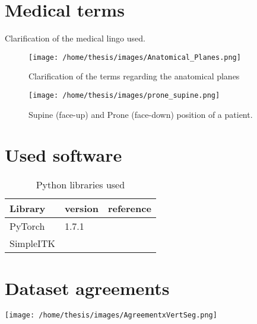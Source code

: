 \documentclass[
    a4paper, %
    9pt, %
    oneside, 
    onecolumn, %
    openany, %
    ]{memoir}
\begin{document}
\chapter{Medical terms}

Clarification of the medical lingo used.

\begin{SCfigure}[][htb]
  \centering
  \texttt{[image: /home/thesis/images/Anatomical\_Planes.png]}
  \caption{Clarification of the terms regarding the anatomical planes
  }
\end{SCfigure}

\begin{SCfigure}[][htb]
  \centering
  \texttt{[image: /home/thesis/images/prone\_supine.png]}
  \caption{Supine (face-up) and Prone (face-down) position of a patient.}
\end{SCfigure}

\chapter{Used software}



\begin{SCtable}[\sidecaptionrelwidth][h]
 
  \begin{tabular}{ p{6cm} l l } 
   \hline
   \hline
   Library & version & reference  \\
   \hline 
   PyTorch & 1.7.1 &  \\ 
   SimpleITK &  &  \\ 
   \hline
   \hline
  \end{tabular}
  \caption{Python libraries used}

\end{SCtable}
\chapter{Dataset agreements\label{seg:datasetagreement}}

\texttt{[image: /home/thesis/images/AgreementxVertSeg.png]}

\printbibliography
\end{document}
